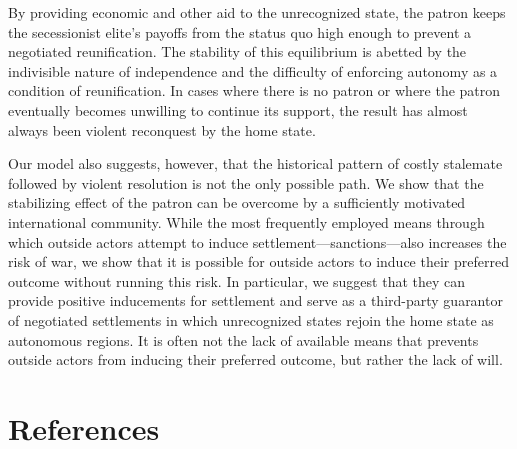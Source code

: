 \documentclass[11pt,letterpaper, notitlepage]{article}
\begin{document}
By providing economic and other aid to the unrecognized state, the patron keeps the secessionist elite's payoffs from the status quo high enough to prevent a negotiated reunification. The stability of this equilibrium is abetted by the indivisible nature of independence and the difficulty of enforcing autonomy as a condition of reunification. In cases where there is no patron or where the patron eventually becomes unwilling to continue its support, the result has almost always been violent reconquest by the home state.

Our model also suggests, however, that the historical pattern of costly stalemate followed by violent resolution is not the only possible path. We show that the stabilizing effect of the patron can be overcome by a sufficiently motivated international community. While the most frequently employed means through which outside actors attempt to induce settlement---sanctions---also increases the risk of war, we show that it is possible for outside actors to induce their preferred outcome without running this risk. In particular, we suggest that they can provide positive inducements for settlement and serve as a third-party guarantor of negotiated settlements in which unrecognized states rejoin the home state as autonomous regions. It is often not the lack of available means that prevents outside actors from inducing their preferred outcome, but rather the lack of will.

\pagebreak

\section{References}\label{A:references}
\hangindent=1cm
\end{document}

